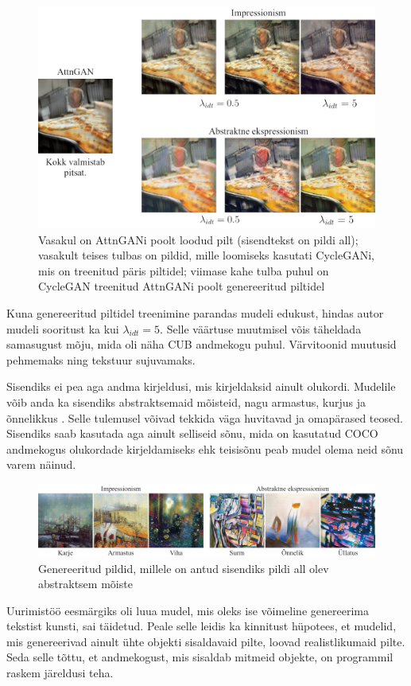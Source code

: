 \documentclass{vilgym}
\begin{document}
	\begin{figure}[ht]
		\includegraphics[width=0.9\linewidth]{images/coco.png}
		\caption{Vasakul on AttnGANi poolt loodud pilt (sisendtekst on pildi all); vasakult teises tulbas on pildid, mille loomiseks kasutati CycleGANi, mis on treenitud päris piltidel; viimase kahe tulba puhul on CycleGAN treenitud AttnGANi poolt genereeritud piltidel}
		\label{fig:coco}
	\end{figure}
	Kuna genereeritud piltidel treenimine parandas mudeli edukust, hindas autor mudeli sooritust ka kui $ \lambda_{idt} = 5 $. Selle väärtuse muutmisel võis täheldada samasugust mõju, mida oli näha CUB andmekogu puhul. Värvitoonid muutusid pehmemaks ning tekstuur sujuvamaks. 

	Sisendiks ei pea aga andma kirjeldusi, mis kirjeldaksid ainult olukordi. Mudelile võib anda ka sisendiks abstraktsemaid mõisteid, nagu armastus, kurjus ja õnnelikkus . Selle tulemusel võivad tekkida väga huvitavad ja omapärased teosed. Sisendiks saab kasutada aga ainult selliseid sõnu, mida on kasutatud COCO andmekogus olukordade kirjeldamiseks ehk teisisõnu peab mudel olema neid sõnu varem näinud.

	\begin{figure}[ht]
		\includegraphics[width=\linewidth]{images/abstraktne.png}
		\caption{Genereeritud pildid, millele on antud sisendiks pildi all olev abstraktsem mõiste}
		\label{fig:abstract}
	\end{figure}
	Uurimistöö eesmärgiks oli luua mudel, mis oleks ise võimeline genereerima tekstist kunsti, sai täidetud. Peale selle leidis ka kinnitust hüpotees, et mudelid, mis genereerivad ainult ühte objekti sisaldavaid pilte, loovad realistlikumaid pilte. Seda selle tõttu, et andmekogust, mis sisaldab mitmeid objekte, on programmil raskem järeldusi teha.
	
\end{document}
